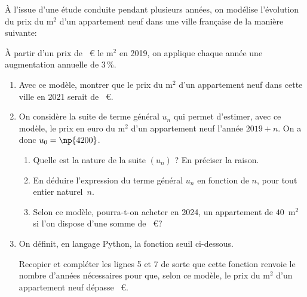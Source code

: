 \medskip
 
À l'issue d'une étude conduite pendant plusieurs années, on modélise l'évolution du prix du m$^2$ d'un appartement neuf dans une ville française de la manière suivante:

À partir d'un prix de ~\euro{} le m$^2$ en 2019, on applique chaque année une augmentation annuelle de 3\,\%.

\medskip

\begin{enumerate}
\item Avec ce modèle, montrer que le prix du m$^2$ d'un appartement neuf dans cette ville en 2021 serait de ~\euro.
\item  On considère la suite de terme général $u_n$ qui permet d'estimer, avec ce modèle, le prix en euro du m$^2$ d'un appartement neuf l'année $2019 + n$. On a donc $u_0 = \np{4200}$.
	\begin{enumerate}
		\item Quelle est la nature de la suite $\left(u_n\right)$ ? En préciser la raison.
		\item En déduire l'expression du terme général $u_n$ en fonction de $n$, pour tout entier naturel~$n$.
		\item Selon ce modèle, pourra-t-on acheter en 2024, un appartement de $40$~m$^2$ si l'on dispose d'une somme de ~\euro ?
	\end{enumerate}
\item  On définit, en langage Python, la fonction seuil ci-dessous.

\begin{center}
\end{center}
 
Recopier et compléter les lignes 5 et 7 de sorte que cette fonction renvoie le nombre d'années nécessaires pour que, selon ce modèle, le prix du m$^2$ d'un appartement neuf dépasse ~\euro.

\end{enumerate}

\bigskip

